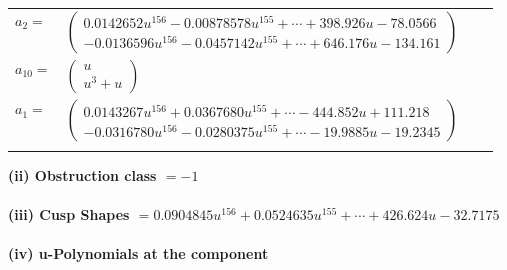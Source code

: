 \documentclass[1p]{elsarticle_modified}
\theoremstyle{definition}
\begin{document}
\begin{tabular}{m{7pt} m{180pt} m{7pt} m{180pt} }
\flushright $a_{2}=$&$\begin{pmatrix}0.0142652 u^{156}-0.00878578 u^{155}+\cdots+398.926 u-78.0566\\-0.0136596 u^{156}-0.0457142 u^{155}+\cdots+646.176 u-134.161\end{pmatrix}$ \\
\flushright $a_{10}=$&$\begin{pmatrix}u\\u^3+u\end{pmatrix}$ \\
\flushright $a_{1}=$&$\begin{pmatrix}0.0143267 u^{156}+0.0367680 u^{155}+\cdots-444.852 u+111.218\\-0.0316780 u^{156}-0.0280375 u^{155}+\cdots-19.9885 u-19.2345\end{pmatrix}$\\&\end{tabular}
\flushleft \textbf{(ii) Obstruction class $= -1$}\\~\\
\flushleft \textbf{(iii) Cusp Shapes $= 0.0904845 u^{156}+0.0524635 u^{155}+\cdots+426.624 u-32.7175$}\\~\\
\newpage\renewcommand{\arraystretch}{1}
\flushleft \textbf{(iv) u-Polynomials at the component}\newline \\
\end{document}
